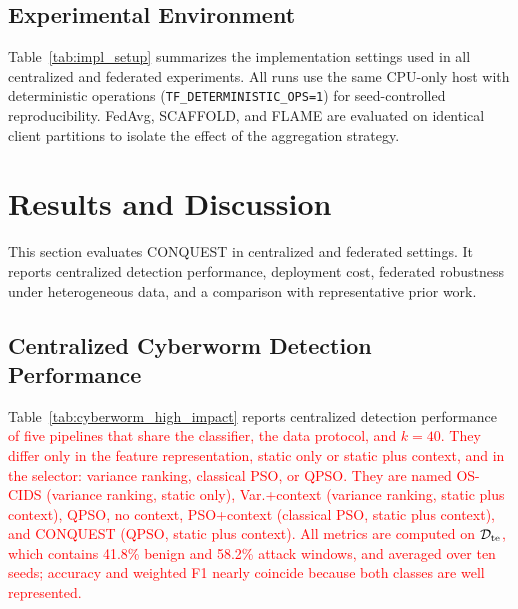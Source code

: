 \documentclass[conference]{IEEEtran}
\begin{document}
\subsection{Experimental Environment}
\label{subsec:impl_details}
Table~\ref{tab:impl_setup} summarizes the implementation settings
used in all centralized and federated experiments. All runs use the
same CPU-only host with deterministic operations
(\texttt{TF\_DETERMINISTIC\_OPS=1}) for seed-controlled
reproducibility. FedAvg, SCAFFOLD, and FLAME are evaluated on
identical client partitions to isolate the effect of the aggregation
strategy.



\section{\textbf{Results and Discussion}}
\label{sec:results_discussion}

This section evaluates CONQUEST in centralized and federated
settings. It reports centralized detection performance, deployment
cost, federated robustness under heterogeneous data, and a comparison
with representative prior work.

\subsection{Centralized Cyberworm Detection Performance}
\label{subsec:obj1_cyberworm_perf}

Table~\ref{tab:cyberworm_high_impact} reports centralized detection
performance \textcolor{red}{of five pipelines that share the
classifier, the data protocol, and $k=40$. They differ only in the
feature representation, static only or static plus context, and in
the selector: variance ranking, classical PSO, or QPSO. They are named
OS-CIDS (variance ranking, static only), Var.+context (variance
ranking, static plus context), QPSO, no context, PSO+context
(classical PSO, static plus context), and CONQUEST (QPSO, static plus
context). All metrics
are computed on $\mathcal{D}_{\rm te}$, which contains 41.8\% benign
and 58.2\% attack windows, and averaged over ten seeds; accuracy and
weighted F1 nearly coincide because both classes are well
represented.}
\end{document}
